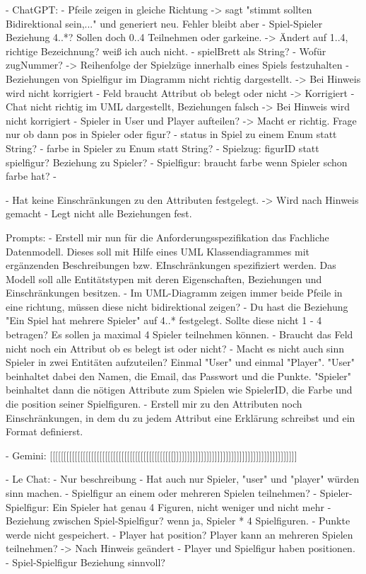 - ChatGPT: 
    - Pfeile zeigen in gleiche Richtung -> sagt "stimmt sollten Bidirektional sein,..." und generiert neu. Fehler bleibt aber
    - Spiel-Spieler Beziehung 4..*? Sollen doch 0..4 Teilnehmen oder garkeine. -> Ändert auf 1..4, richtige Bezeichnung? weiß ich auch nicht.
    - spielBrett als String?
    - Wofür zugNummer? -> Reihenfolge der Spielzüge innerhalb eines Spiels festzuhalten
    - Beziehungen von Spielfigur im Diagramm nicht richtig dargestellt. -> Bei Hinweis wird nicht korrigiert
    - Feld braucht Attribut ob belegt oder nicht -> Korrigiert
    - Chat nicht richtig im UML dargestellt, Beziehungen falsch -> Bei Hinweis wird nicht korrigiert
    - Spieler in User und Player aufteilen? -> Macht er richtig. Frage nur ob dann pos in Spieler oder figur?
    - status in Spiel zu einem Enum statt String?
    - farbe in Spieler zu Enum statt String?
    - Spielzug: figurID statt spielfigur? Beziehung zu Spieler?
    - Spielfigur: braucht farbe wenn Spieler schon farbe hat?
    - 

    - Hat keine Einschränkungen zu den Attributen festgelegt. -> Wird nach Hinweis gemacht
    - Legt nicht alle Beziehungen fest.

    Prompts:
        - Erstell mir nun für die Anforderungsspezifikation das Fachliche Datenmodell. Dieses soll mit Hilfe eines UML Klassendiagrammes mit ergänzenden Beschreibungen bzw. EInschränkungen spezifiziert werden. Das Modell soll alle Entitätstypen mit deren Eigenschaften, Beziehungen und Einschränkungen besitzen.
        - Im UML-Diagramm zeigen immer beide Pfeile in eine richtung, müssen diese nicht bidirektional zeigen?
        - Du hast die Beziehung "Ein Spiel hat mehrere Spieler" auf 4..* festgelegt. Sollte diese nicht 1 - 4 betragen? Es sollen ja maximal 4 Spieler teilnehmen können.
        - Braucht das Feld nicht noch ein Attribut ob es belegt ist oder nicht?
        - Macht es nicht auch sinn Spieler in zwei Entitäten aufzuteilen? Einmal "User" und einmal "Player".  "User" beinhaltet dabei den Namen, die Email, das Passwort und die Punkte. "Spieler" beinhaltet dann die nötigen Attribute zum Spielen wie SpielerID, die Farbe und die position seiner Spielfiguren.
        - Erstell mir zu den Attributen noch Einschränkungen, in dem du zu jedem Attribut eine Erklärung schreibst und ein Format definierst.


- Gemini: [[[[[[[[[[[[[[[[[[[[[[[[[[[[[[[[[[[[[[[[[[[[[]]]]]]]]]]]]]]]]]]]]]]]]]]]]]]]]]]]]]]]]]]]]]


- Le Chat:
    - Nur beschreibung
    - Hat auch nur Spieler, "user" und "player" würden sinn machen.
    - Spielfigur an einem oder mehreren Spielen teilnehmen?
    - Spieler-Spielfigur: Ein Spieler hat genau 4 Figuren, nicht weniger und nicht mehr
    - Beziehung zwischen Spiel-Spielfigur? wenn ja, Spieler * 4 Spielfiguren.
    - Punkte werde nicht gespeichert.
    - Player hat position? Player kann an mehreren Spielen teilnehmen? -> Nach Hinweis geändert
    - Player und Spielfigur haben positionen.
    - Spiel-Spielfigur Beziehung sinnvoll?

